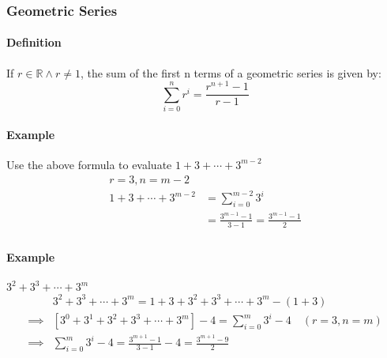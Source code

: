 \subsubsection*{Geometric Series}
\paragraph*{Definition}
If $r \in \mathbb{R} \land r \neq 1$, the sum of the first n terms of a geometric series is given by:
\begin{equation*}
    \sum_{i=0}^{n} r^i = \frac{r^{n+1} - 1}{r - 1}
\end{equation*}

\paragraph*{Example}
Use the above formula to evaluate $1 + 3 + \cdots + 3^{m-2}$
\begin{align*}
    r = 3, n = m-2\\
    1 + 3 + \cdots + 3^{m-2} &= \sum_{i=0}^{m-2} 3^i\\
    &= \frac{3^{m-1} - 1}{3 - 1} = \frac{3^{m-1}-1}{2}\\
\end{align*}

\paragraph*{Example}
$3^2 + 3^3 + \cdots + 3^{m}$
\begin{align*}
   &3^2 + 3^3 + \cdots + 3^{m} = 1 + 3 + 3^2 + 3^3 + \cdots + 3^{m} - (1 + 3)\\
   \implies & [3^0 + 3^1 + 3^2 + 3^3 + \cdots + 3^{m}] - 4 = \sum_{i=0}^{m} 3^i - 4 \quad (r=3, n=m)\\
   \implies & \sum_{i=0}^{m} 3^i - 4 = \frac{3^{m+1} - 1}{3 - 1} - 4 = \frac{3^{m+1} - 9}{2}\\
\end{align*}